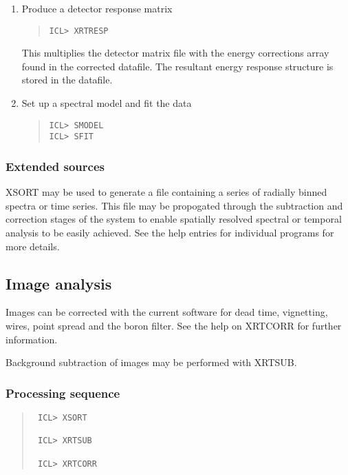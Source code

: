 \documentclass{book}
\renewcommand{\_}{{\tt\char'137}}     %
\begin{document}
\begin{enumerate}
\begin{quote}
\begin{verbatim}
\begin{quote}\begin{verbatim}
ICL> XRTCORR
\end{verbatim}\end{quote}
This will correct the spectrum for the energy independent
effects, dead time and wires. In addition it produces an
array of energy dependent correction factors within the
datafile. These are used as the effective area at each energy
for this datafile.
\item Produce a detector response matrix
\begin{quote}\begin{verbatim}
ICL> XRTRESP
\end{verbatim}\end{quote}
This multiplies the detector matrix file with the energy
corrections array found in the corrected datafile. The
resultant energy response structure is stored in the datafile.
 
\item Set up a spectral model and fit the data
\begin{quote}\begin{verbatim}
ICL> SMODEL
ICL> SFIT
\end{verbatim}\end{quote}
\end{enumerate}
\subsubsection{Extended sources}
XSORT may be used to generate a file containing a series of radially
binned spectra or time series. This file may be propogated through the
subtraction and correction stages of the system to enable spatially
resolved spectral or temporal analysis to be easily achieved. See the
help entries for individual programs for more details.
 
\subsection{Image analysis}
Images can be corrected with the current software for dead time,
vignetting, wires, point spread and the boron filter. See the help on
XRTCORR for further information.
 
Background subtraction of images may be performed with XRTSUB.
 
\subsubsection{Processing sequence}
\begin{quote}\begin{verbatim}
 ICL> XSORT
 
 ICL> XRTSUB
 
 ICL> XRTCORR
\end{verbatim}\end{quote}
\end{document}

